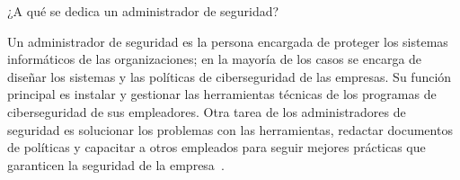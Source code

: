 ¿A qué se dedica un administrador de seguridad?

Un administrador de seguridad es la persona encargada de proteger los sistemas informáticos de las organizaciones; en la mayoría de los casos se encarga de diseñar los sistemas y las políticas de ciberseguridad de las empresas. Su función principal es instalar y gestionar las herramientas técnicas de los programas de ciberseguridad de sus empleadores. Otra tarea de los administradores de seguridad es solucionar los problemas con las herramientas, redactar documentos de políticas y capacitar a otros empleados para seguir mejores prácticas que garanticen la seguridad de la empresa~\cite{AS}.
